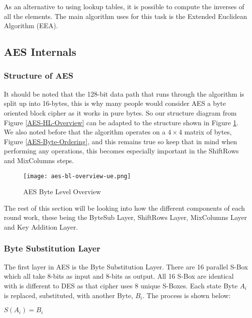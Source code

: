 As an alternative to using lookup tables, it is possible to compute the inverses of all the elements. The main algorithm uses for this task is the Extended Euclidean Algorithm (EEA).

\subsection{AES Internals}
\subsubsection{Structure of AES}

It should be noted that the 128-bit data path that runs through the algorithm is split up into 16-bytes, this is why many people would consider AES a byte oriented block cipher as it works in pure bytes. So our structure diagram from Figure \ref{AES-HL-Overview} can be adapted to the structure shown in Figure \ref{AES-BL-Overview}. We also noted before that the algorithm operates on a $4\times4$ matrix of bytes, Figure \ref{AES-Byte-Ordering}, and this remains true so keep that in mind when performing any operations, this becomes especially important in the ShiftRows and MixColumns steps.

\begin{figure}[H]
\begin{center}
\texttt{[image: aes-bl-overview-ue.png]}
\end{center}
\caption{AES Byte Level Overview}
\label{AES-BL-Overview}
\end{figure}

The rest of this section will be looking into how the different components of each round work, these being the ByteSub Layer, ShiftRows Layer, MixColumns Layer and Key Addition Layer.

\subsubsection{Byte Substitution Layer}

The first layer in AES is the Byte Substitution Layer. There are 16 parallel S-Box which all take 8-bits as input and 8-bits as output. All 16 S-Box are identical with is different to DES as that cipher uses 8 unique S-Boxes. Each state Byte $A_i$ is replaced, substituted, with another Byte, $B_i$. The process is shown below:

\begin{center}
$S(A_i) = B_i$
\end{center}

